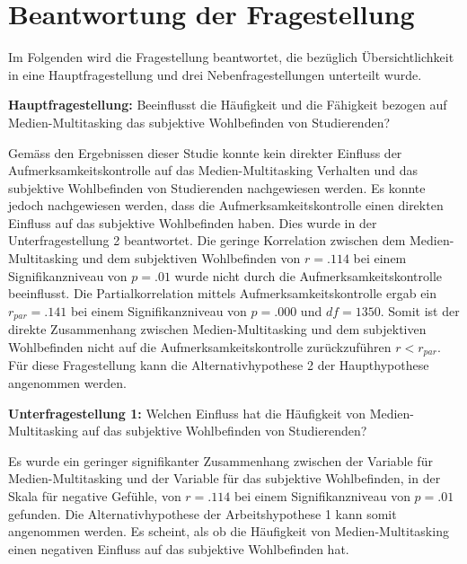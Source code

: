\section{Beantwortung der Fragestellung}\label{section.diskussion.fragestellung}
Im Folgenden wird die Fragestellung beantwortet, die bezüglich Übersichtlichkeit in eine Hauptfragestellung und drei Nebenfragestellungen unterteilt wurde. 
\par
\textbf{Hauptfragestellung:} Beeinflusst die Häufigkeit und die Fähigkeit bezogen auf Medien-Multitasking das subjektive Wohlbefinden von Studierenden?
\par
Gemäss den Ergebnissen dieser Studie konnte kein direkter Einfluss der Aufmerksamkeitskontrolle auf das Medien-Multitasking Verhalten und das subjektive Wohlbefinden von Studierenden nachgewiesen werden. Es konnte jedoch nachgewiesen werden, dass die Aufmerksamkeitskontrolle einen direkten Einfluss auf das subjektive Wohlbefinden haben. Dies wurde in der Unterfragestellung 2 beantwortet. Die geringe Korrelation zwischen dem Medien-Multitasking und dem subjektiven Wohlbefinden von $r=.114$ bei einem Signifikanzniveau von $p=.01$ wurde nicht durch die Aufmerksamkeitskontrolle beeinflusst. Die Partialkorrelation mittels Aufmerksamkeitskontrolle ergab ein $r_{par}=.141$ bei einem Signifikanzniveau von $p=.000$ und $df=1350$. Somit ist der direkte Zusammenhang zwischen Medien-Multitasking und dem subjektiven Wohlbefinden nicht auf die Aufmerksamkeitskontrolle zurückzuführen $r<r_{par}$. Für diese Fragestellung kann die Alternativhypothese 2 der Haupthypothese angenommen werden.
\par
\textbf{Unterfragestellung 1:} Welchen Einfluss hat die Häufigkeit von Medien-Multitasking auf das subjektive Wohlbefinden von Studierenden?
\par
Es wurde ein geringer signifikanter Zusammenhang zwischen der Variable für Medien-Multitasking und der Variable für das subjektive Wohlbefinden, in der Skala für negative Gefühle, von $r=.114$ bei einem Signifikanzniveau von $p=.01$ gefunden. Die Alternativhypothese der Arbeitshypothese 1 kann somit angenommen werden. Es scheint, als ob die Häufigkeit von Medien-Multitasking einen negativen Einfluss auf das subjektive Wohlbefinden hat. \\

